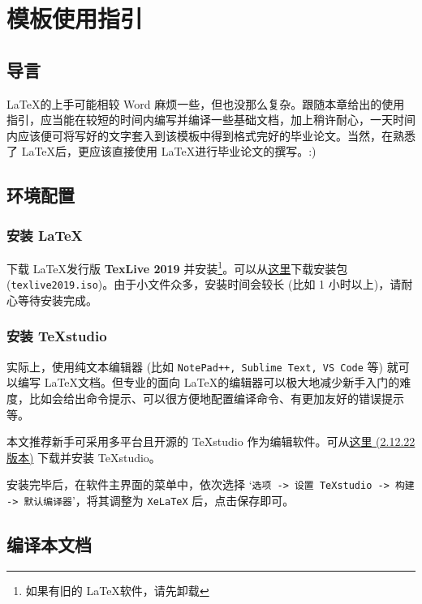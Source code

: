 
\chapter{模板使用指引}

\section{导言}

\LaTeX 的上手可能相较 Word 麻烦一些，但也没那么复杂。跟随本章给出的使用指引，应当能在较短的时间内编写并编译一些基础文档，加上稍许耐心，一天时间内应该便可将写好的文字套入到该模板中得到格式完好的毕业论文。当然，在熟悉了 \LaTeX 后，更应该直接使用 \LaTeX 进行毕业论文的撰写。:)

\section{环境配置}

\subsection{安装 \LaTeX}

下载 \LaTeX 发行版 \textbf{TexLive 2019} 并安装\footnote{如果有旧的 \LaTeX 软件，请先卸载}。可以从\href{http://mirror.ctan.org/systems/texlive/Images/}{这里}下载安装包 (\texttt{texlive2019.iso})。由于小文件众多，安装时间会较长 (比如 1 小时以上)，请耐心等待安装完成。

\subsection{安装 TeXstudio}

实际上，使用纯文本编辑器 (比如 \texttt{NotePad++, Sublime Text, VS Code} 等) 就可以编写 \LaTeX 文档。但专业的面向 \LaTeX 的编辑器可以极大地减少新手入门的难度，比如会给出命令提示、可以很方便地配置编译命令、有更加友好的错误提示等。

本文推荐新手可采用多平台且开源的 TeXstudio 作为编辑软件。可从\href{https://github.com/texstudio-org/texstudio/releases/download/2.12.22/texstudio-2.12.22-win-qt5.exe}{这里 (2.12.22 版本)} 下载并安装 TeXstudio。

安装完毕后，在软件主界面的菜单中，依次选择 `\texttt{选项 -> 设置 TeXstudio -> 构建 -> 默认编译器}'，将其调整为 \texttt{XeLaTeX} 后，点击保存即可。

\section{编译本文档}


